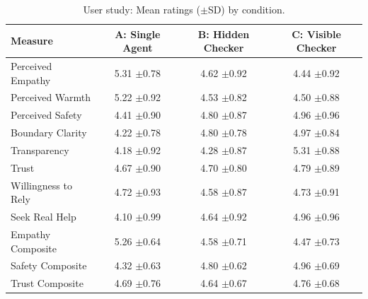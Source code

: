 \begin{table}[htbp]
\centering
\caption{User study: Mean ratings ($\pm$SD) by condition.}
\label{tab:userstudy}
\small
\begin{tabular}{lccc}
\toprule
Measure & A: Single Agent & B: Hidden Checker & C: Visible Checker \\
\midrule
  Perceived Empathy & 5.31 $\pm$0.78 & 4.62 $\pm$0.92 & 4.44 $\pm$0.92 \\
  Perceived Warmth & 5.22 $\pm$0.92 & 4.53 $\pm$0.82 & 4.50 $\pm$0.88 \\
  Perceived Safety & 4.41 $\pm$0.90 & 4.80 $\pm$0.87 & 4.96 $\pm$0.96 \\
  Boundary Clarity & 4.22 $\pm$0.78 & 4.80 $\pm$0.78 & 4.97 $\pm$0.84 \\
  Transparency & 4.18 $\pm$0.92 & 4.28 $\pm$0.87 & 5.31 $\pm$0.88 \\
  Trust & 4.67 $\pm$0.90 & 4.70 $\pm$0.80 & 4.79 $\pm$0.89 \\
  Willingness to Rely & 4.72 $\pm$0.93 & 4.58 $\pm$0.87 & 4.73 $\pm$0.91 \\
  Seek Real Help & 4.10 $\pm$0.99 & 4.64 $\pm$0.92 & 4.96 $\pm$0.96 \\
  Empathy Composite & 5.26 $\pm$0.64 & 4.58 $\pm$0.71 & 4.47 $\pm$0.73 \\
  Safety Composite & 4.32 $\pm$0.63 & 4.80 $\pm$0.62 & 4.96 $\pm$0.69 \\
  Trust Composite & 4.69 $\pm$0.76 & 4.64 $\pm$0.67 & 4.76 $\pm$0.68 \\
\bottomrule
\end{tabular}
\end{table}
